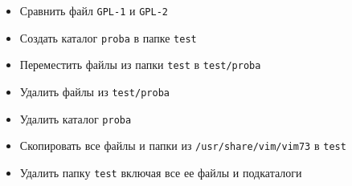 \documentclass[a4paper,12pt]{article}
\begin{document}
\begin{flushleft}
\begin{enumerate}
\begin{itemize}
                \item Сравнить файл \texttt{GPL-1} и \texttt{GPL-2}
                \item Создать каталог \texttt{proba} в папке \texttt{test}
                \item Переместить файлы из папки \texttt{test} в \texttt{test/proba}
                \item Удалить файлы из \texttt{test/proba}
                \item Удалить каталог \texttt{proba}
                \item Скопировать все файлы и папки из \texttt{/usr/share/vim/vim73} в \texttt{test}
                \item Удалить папку \texttt{test} включая все ее файлы и подкаталоги
            \end{itemize}
        \end{enumerate}
    \end{flushleft}
\end{document}
